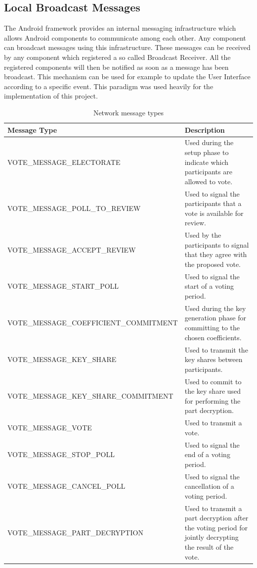 \documentclass[numbers=noenddot, abstract=on, a4paper, headsepline,
footsepline, oneside, openright, draft=off, listof=leveldown]{scrreprt}
\begin{document}
\subsection{Local Broadcast Messages}
The Android framework provides an internal messaging infrastructure which allows
Android components to communicate among each other. Any component can broadcast
messages using this infrastructure. These messages can be received by any
component which registered a so called Broadcast Receiver. All the registered
components will then be notified as soon as a message has been broadcast. This
mechanism can be used for example to update the User Interface according to a
specific event.
This paradigm was used heavily for the implementation of this project.


\begin{table}[htbp]
	\centering
	\renewcommand{\arraystretch}{1.4}
	\begin{minipage}{\linewidth}
	\begin{tabularx}{\textwidth}{lX}
		\toprule
		\textbf{Message Type}					& 	\textbf{Description}			\\
		\midrule
		VOTE\_MESSAGE\_ELECTORATE					& 	Used during the setup phase to
														indicate which participants are allowed to vote.\\
		VOTE\_MESSAGE\_POLL\_TO\_REVIEW				& 	Used to signal the participants that a
														vote is available for review.\\
		VOTE\_MESSAGE\_ACCEPT\_REVIEW				& 	Used by the participants to signal that
														they agree with the proposed vote.\\
		VOTE\_MESSAGE\_START\_POLL					& 	Used to signal the start of a voting
														period. \\
		VOTE\_MESSAGE\_COEFFICIENT\_COMMITMENT		& 	Used during the key generation
														phase for committing to the chosen coefficients.\\
		VOTE\_MESSAGE\_KEY\_SHARE					& 	Used to transmit the key shares between
														participants.\\
		VOTE\_MESSAGE\_KEY\_SHARE\_COMMITMENT		& 	Used to commit to the key share
														used for performing the part decryption.\\
		VOTE\_MESSAGE\_VOTE							& 	Used to transmit a vote.	\\

		VOTE\_MESSAGE\_STOP\_POLL					& 	Used to signal the end of a voting period.\\
		VOTE\_MESSAGE\_CANCEL\_POLL					& 	Used to signal the cancellation of a
														voting period.\\
		VOTE\_MESSAGE\_PART\_DECRYPTION				& 	Used to transmit a part decryption
														after the voting period for jointly decrypting the result of the
														vote.\\
		

		\bottomrule
	\end{tabularx}
	\end{minipage}
	\renewcommand{\arraystretch}{1}
	\caption{Network message types}
	\label{tab:networkmessagetypes}
\end{table}
\end{document}
